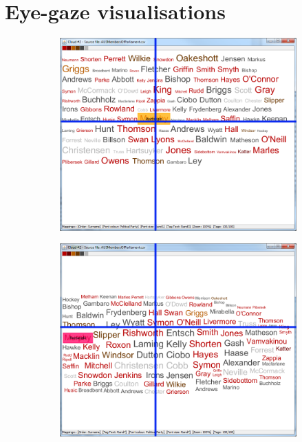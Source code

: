 \ifpdf
    \graphicspath{{Appendix3/Appendix3Figs/PNG/}{Appendix3/Appendix3Figs/PDF/}{Appendix3/Appendix3Figs/}}
\else
    \graphicspath{{Appendix3/Appendix3Figs/EPS/}{Appendix3/Appendix3Figs/}}
\fi  

\section{Eye-gaze visualisations} \label{appdx:eyegaze}

\begin{figure}[!htb]
\centering
\begin{subfigure}{.5\textwidth}
  \centering
  \includegraphics[scale=0.25]{Experiment1/Trial1/C2S2L2.png}
\end{subfigure}%
\begin{subfigure}{.5\textwidth}
  \centering
  \includegraphics[scale=0.25]{Experiment1/Trial1/C2S2L1.png}

\end{subfigure}
\end{figure}
